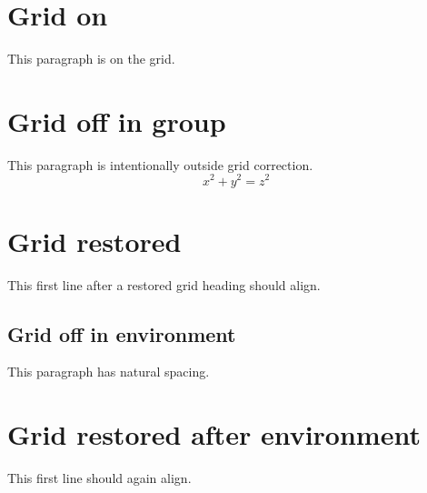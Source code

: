 \documentclass{article}
\begin{document}
\section{Grid on}
This paragraph is on the grid.
{\GridAutoOff
\section{Grid off in group}
This paragraph is intentionally outside grid correction.
\begin{equation}x^2+y^2=z^2\end{equation}
}
\section{Grid restored}
This first line after a restored grid heading should align.
\begin{gridautoff}
\section{Grid off in environment}
This paragraph has natural spacing.
\end{gridautoff}
\section{Grid restored after environment}
This first line should again align.
\end{document}
